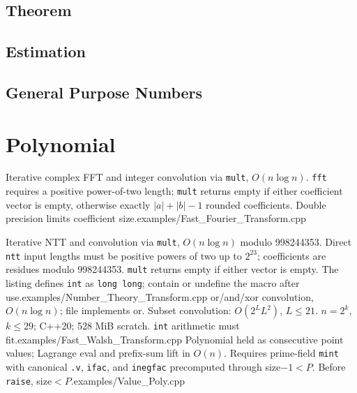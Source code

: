 \subsection{Theorem}

\subsection{Estimation}

%
\subsection{General Purpose Numbers}


\section{Polynomial}
%
{Iterative complex FFT and integer convolution via \texttt{mult}, $O(n\log n)$. \texttt{fft} requires a positive power-of-two length; \texttt{mult} returns empty if either coefficient vector is empty, otherwise exactly $|a|+|b|-1$ rounded coefficients. Double precision limits coefficient size.}{examples/Fast_Fourier_Transform.cpp}

%
{Iterative NTT and convolution via \texttt{mult}, $O(n\log n)$ modulo 998244353. Direct \texttt{ntt} input lengths must be positive powers of two up to $2^{23}$; coefficients are residues modulo 998244353. \texttt{mult} returns empty if either vector is empty. The listing defines \texttt{int} as \texttt{long long}; contain or undefine the macro after use.}{examples/Number_Theory_Transform.cpp}
%
{or/and/xor convolution, $O(n\log n)$; file implements or. Subset convolution: $O(2^LL^2)$, $L\le21$. $n=2^k$, $k\le29$; C++20; 528 MiB scratch. \texttt{int} arithmetic must fit.}{examples/Fast_Walsh_Transform.cpp}
%
{Polynomial held as consecutive point values; Lagrange eval and prefix-sum lift in $O(n)$. Requires prime-field \texttt{mint} with canonical \texttt{.v}, \texttt{ifac}, and \texttt{inegfac} precomputed through size$-1<P$. Before \texttt{raise}, size$<P$.}{examples/Value_Poly.cpp}
